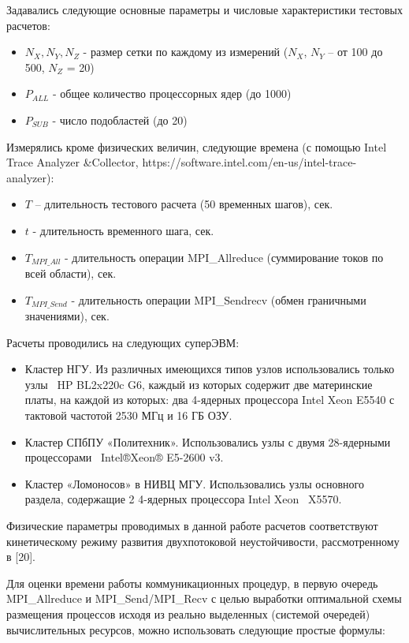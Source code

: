         Задавались следующие основные параметры и числовые характеристики тестовых расчетов:
         \begin{itemize} 
        \item $N_X, N_Y, N_Z$  - размер сетки по каждому из измерений ($N_X$, $N_Y$ – от 100 до 500, $N_Z$ = 20)
        \item $P_{ALL}$  - общее количество процессорных ядер (до 1000)
        \item $P_{SUB}$  - число подобластей (до 20)
         \end{itemize} 
        Измерялись кроме физических величин, следующие времена (с помощью Intel Trace Analyzer \&Collector, https://software.intel.com/en-us/intel-trace-analyzer):
         \begin{itemize} 
        \item $T$ – длительность тестового расчета (50 временных шагов), сек.
       \item  $t$  - длительность временного шага, сек.
        \item $T_{MPI\_All}$ - длительность операции MPI\_Allreduce (суммирование токов по всей области), сек.
        \item $T_{MPI\_Send}$ - длительность операции MPI\_Sendrecv (обмен граничными значениями), сек.
        \end{itemize}
        
        
        
        Расчеты проводились на следующих суперЭВМ:
        \begin{itemize}
        \item Кластер НГУ. Из различных имеющихся типов узлов использовались только узлы  HP BL2x220c G6, каждый из которых содержит две материнские платы, на каждой из которых: два 4-ядерных процессора Intel Xeon E5540 с тактовой частотой 2530 МГц и 16 ГБ ОЗУ.
        \item Кластер СПбПУ «Политехник». Использовались узлы с двумя 28-ядерными процессорами  Intel®Xeon® E5-2600 v3.
        \item Кластер «Ломоносов» в НИВЦ МГУ. Использовались узлы основного раздела, содержащие 2 4-ядерных процессора Intel Xeon  X5570. 
        \end{itemize}
        
        Физические параметры проводимых в данной работе расчетов соответствуют кинетическому режиму развития двухпотоковой неустойчивости, рассмотренному в [20].
        
        Для оценки времени работы коммуникационных процедур, в первую очередь MPI\_Allreduce и MPI\_Send/MPI\_Recv с целью выработки оптимальной схемы размещения процессов исходя из реально выделенных (системой очередей) вычислительных ресурсов, можно использовать следующие простые формулы:
        
